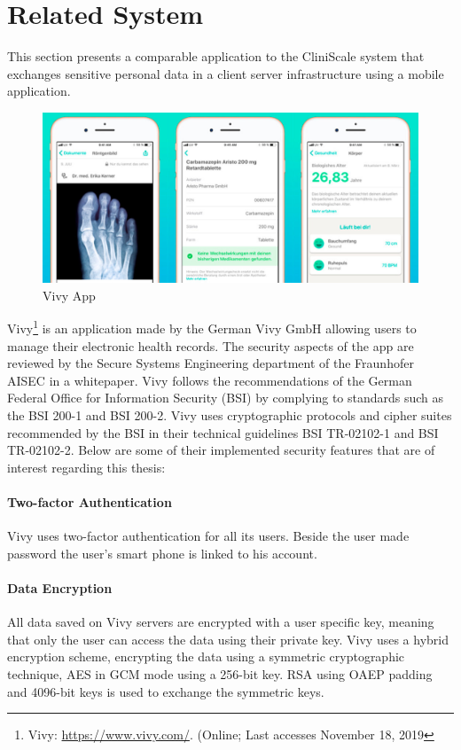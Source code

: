 \section{Related System}
\label{relatedsystems}
\label{vivy}
This section presents a comparable application to the CliniScale system that exchanges sensitive personal data in a client server infrastructure using a mobile application.


\begin{figure}[H]
  \includegraphics[width=\linewidth]{images/vivy2.png}
  \caption{Vivy App}
  \label{fig:vivy}
\end{figure}

Vivy\footnote{Vivy: \url{https://www.vivy.com/}. (Online; Last accesses November 18, 2019} is an application made by the German Vivy GmbH allowing users to manage their electronic health records. The security aspects of the app are reviewed by the Secure Systems Engineering department of the Fraunhofer AISEC in a whitepaper\cite{vivywhitepaper}.
\newline
Vivy follows the recommendations of the German Federal Office for Information Security (BSI) by complying to standards such as the BSI 200-1 and BSI 200-2. Vivy uses cryptographic protocols and cipher suites recommended by the BSI in their technical guidelines BSI TR-02102-1 and BSI TR-02102-2.
\newline
Below are some of their implemented security features that are of interest regarding this thesis:
    \paragraph{Two-factor Authentication} Vivy uses two-factor authentication for all its users. Beside the user made password the user’s smart phone is linked to his account.
    \paragraph{Data Encryption} All data saved on Vivy servers are encrypted with a user specific key, meaning that only the user can access the data using their private key. Vivy uses a hybrid encryption scheme, encrypting the data using a symmetric cryptographic technique, AES in GCM mode using a 256-bit key.  RSA using OAEP padding and 4096-bit keys is used to exchange the symmetric keys.
